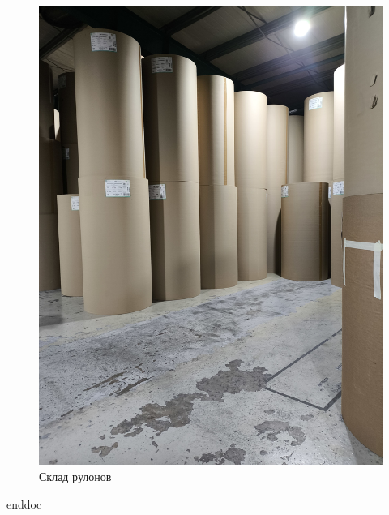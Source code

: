 \begin{figure}
\begin{center}
 \includegraphics[height=0.9\textheight, keepaspectratio]{Pics/IX склад сырья.jpg}
\end{center}
 \caption{Склад рулонов}
 \label{pic:IX склад сырья}
\end{figure}






\clearpage
 {enddoc}
